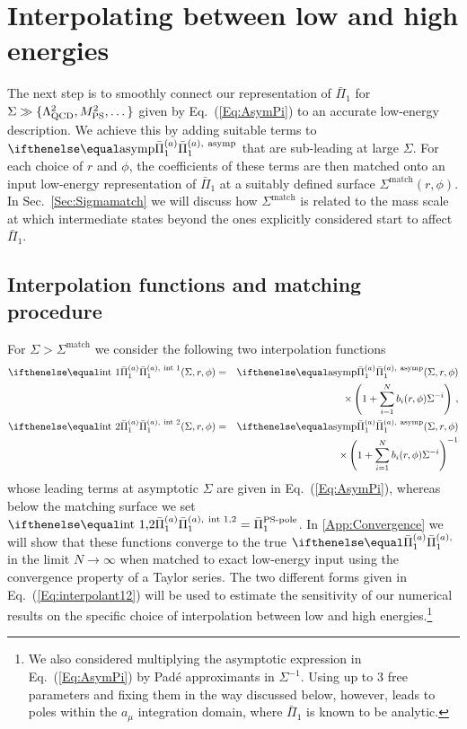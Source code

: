 \section{Interpolating between low and high energies}
\label{Sec:Int}
The next step is to smoothly connect our representation of $\bar{\Pi}_1$ for $\Sigma \gg \{\Lambda_\text{QCD}^2,M_\text{PS}^2,\dots\}$ given by Eq.~(\ref{Eq:AsymPi}) to an accurate low-energy description. We achieve this by adding suitable terms to $\PiPS[\text{asymp}]$ that are sub-leading at large $\Sigma$. For each choice of $r$ and $\phi$, the coefficients of these terms are then matched onto an input low-energy representation of $\bar{\Pi}_1$ at a suitably defined surface $\Sigma^\text{match}(r,\phi)$. In Sec.~\ref{Sec:Sigmamatch} we will discuss how $\Sigma^\text{match}$ is related to the mass scale at which intermediate states beyond the ones explicitly considered start to affect $\bar{\Pi}_1$. 


\subsection{Interpolation functions and matching procedure}
For $\Sigma > \Sigma^\text{match}$ we consider the following two interpolation functions
\begin{eqnarray}
\PiPS[\text{int 1}](\Sigma, r, \phi) & = & \PiPS[\text{asymp}](\Sigma, r, \phi) \nonumber\\
&&\times \left(1 + \sum_{i = 1}^{N}b_i(r, \phi) \Sigma^{-i}\right)\,, \nonumber \\
\PiPS[\text{int 2}](\Sigma, r, \phi) & = & \PiPS[\text{asymp}](\Sigma, r, \phi) \nonumber\\
&&\times \left(1 + \sum_{i = 1}^{N}b_i(r, \phi) \Sigma^{-i}\right)^{-1}
\label{Eq:interpolant12}
\end{eqnarray}
whose leading terms at asymptotic $\Sigma$ are given in Eq.~(\ref{Eq:AsymPi}), whereas below the matching surface we set $\PiPS[\text{int 1,2}] = \bar{\Pi}_1^\text{PS-pole}$. In \ref{App:Convergence} we will show that these functions converge to the true $\PiPS$ in the limit $N\to\infty$ when matched to exact low-energy input using the convergence property of a Taylor series. The two different forms given in Eq.~(\ref{Eq:interpolant12}) will be used to estimate the sensitivity of our numerical results on the specific choice of interpolation between low and high energies.\footnote{We also considered multiplying the asymptotic expression in Eq.~(\ref{Eq:AsymPi}) by Pad\'e approximants in $\Sigma^{-1}$. Using up to 3 free parameters and fixing them in the way discussed below, however, leads to poles within the $a_\mu$ integration domain, where $\bar{\Pi}_1$ is known to be analytic.}

